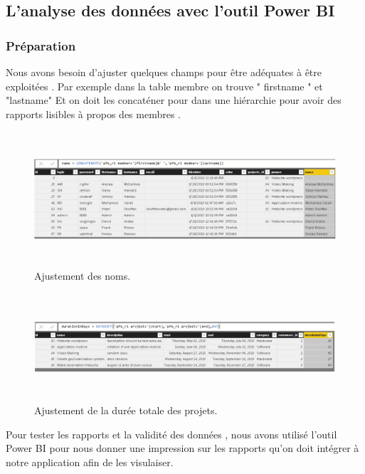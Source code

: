 \subsection{  L'analyse des donn\'{e}es avec   l'outil Power BI }


\subsubsection{Pr\'{e}paration}
Nous avons besoin d'ajuster quelques champs pour \^{e}tre ad\'{e}quates \`{a} \^{e}tre
exploit\'{e}es . Par exemple dans la table membre on trouve " firstname " et
"lastname" Et on doit les concat\'{e}ner pour dans une hi\'{e}rarchie pour avoir
des rapports lisibles \`{a} propos des membres .





\begin{figure}[H]
\center
\includegraphics[width=14cm,height=5cm]{./figures/pb1.png}
\caption{Ajustement des noms.}
\end{figure}



\bigskip
\bigskip


\begin{figure}[H]
\center
\includegraphics[width=14cm,height=4cm]{./figures/pb2.png}
\caption{Ajustement de la dur\'{e}e totale des projets.}
\end{figure}


Pour tester les rapports et la validit\'{e} des donn\'{e}es , nous avons utilis\'{e} l'outil
Power BI pour nous donner une impression sur les rapports qu'on doit
int\'{e}grer \`{a} notre application afin de les visulaiser.

